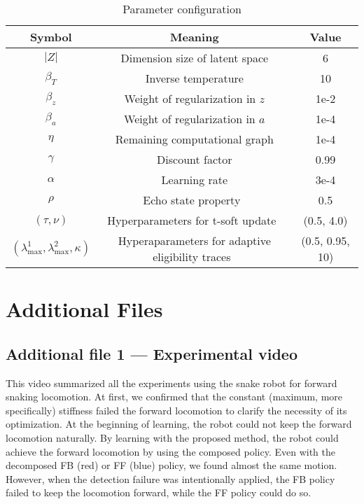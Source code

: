 \documentclass{bmcart}
\begin{document}
\begin{backmatter}
\begin{table}[!ht]
    \caption{Parameter configuration}
    \label{tab:parameter}
    \centering
    \begin{tabular}{ccc}
        \hline\hline
        Symbol & Meaning & Value
        \\
        \hline
        $|Z|$ & Dimension size of latent space & 6
        \\
        $\beta_T$ & Inverse temperature & 10
        \\
        $\beta_z$ & Weight of regularization in $z$ & 1e-2
        \\
        $\beta_a$ & Weight of regularization in $a$ & 1e-4
        \\
        $\eta$ & Remaining computational graph & 1e-4
        \\
        $\gamma$ & Discount factor & 0.99
        \\
        $\alpha$ & Learning rate & 3e-4
        \\
        $\rho$ & Echo state property~\cite{gallicchio2018design} & 0.5
        \\
        $(\tau, \nu)$ & Hyperparameters for t-soft update~\cite{kobayashi2021t} & (0.5, 4.0)
        \\
        $(\lambda_\mathrm{max}^1, \lambda_\mathrm{max}^2, \kappa)$ & Hyperaparameters for adaptive eligibility traces~\cite{kobayashi2020adaptive} & (0.5, 0.95, 10)
        \\
        \hline\hline
    \end{tabular}
\end{table}

\clearpage
\section*{Additional Files}
\subsection*{Additional file 1 --- Experimental video}
This video summarized all the experiments using the snake robot for forward snaking locomotion.
At first, we confirmed that the constant (maximum, more specifically) stiffness failed the forward locomotion to clarify the necessity of its optimization.
At the beginning of learning, the robot could not keep the forward locomotion naturally.
By learning with the proposed method, the robot could achieve the forward locomotion by using the composed policy.
Even with the decomposed FB (red) or FF (blue) policy, we found almost the same motion.
However, when the detection failure was intentionally applied, the FB policy failed to keep the locomotion forward, while the FF policy could do so.

\end{backmatter}
\end{document}
